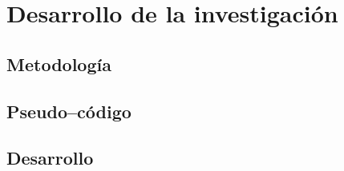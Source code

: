 \chapter{Desarrollo de la investigaci\'{o}n}
\label{sec:chapter4}





\section{Metodolog\'ia}
\label{subsec:411metodologia}




\section{Pseudo--c\'odigo}
\label{subsec:422pseudocodigo}




\section{Desarrollo}



